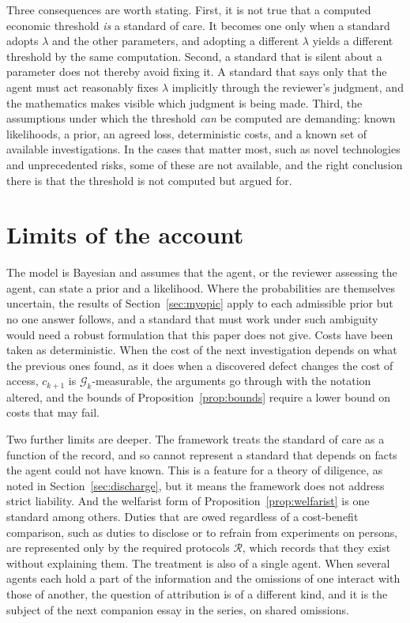 \documentclass[11pt]{article}
\newcommand{\G}{\mathcal G}
\theoremstyle{plain}
\theoremstyle{definition}
\begin{document}
Three consequences are worth stating. First, it is not true that a computed economic threshold \emph{is} a standard of care. It becomes one only when a standard adopts $\lambda$ and the other parameters, and adopting a different $\lambda$ yields a different threshold by the same computation. Second, a standard that is silent about a parameter does not thereby avoid fixing it. A standard that says only that the agent must act reasonably fixes $\lambda$ implicitly through the reviewer's judgment, and the mathematics makes visible which judgment is being made. Third, the assumptions under which the threshold \emph{can} be computed are demanding: known likelihoods, a prior, an agreed loss, deterministic costs, and a known set of available investigations. In the cases that matter most, such as novel technologies and unprecedented risks, some of these are not available, and the right conclusion there is that the threshold is not computed but argued for.

\section{Limits of the account}\label{sec:limits}

The model is Bayesian and assumes that the agent, or the reviewer assessing the agent, can state a prior and a likelihood. Where the probabilities are themselves uncertain, the results of Section~\ref{sec:myopic} apply to each admissible prior but no one answer follows, and a standard that must work under such ambiguity would need a robust formulation that this paper does not give. Costs have been taken as deterministic. When the cost of the next investigation depends on what the previous ones found, as it does when a discovered defect changes the cost of access, $c_{k+1}$ is $\G_k$-measurable, the arguments go through with the notation altered, and the bounds of Proposition~\ref{prop:bounds} require a lower bound on costs that may fail.

Two further limits are deeper. The framework treats the standard of care as a function of the record, and so cannot represent a standard that depends on facts the agent could not have known. This is a feature for a theory of diligence, as noted in Section~\ref{sec:discharge}, but it means the framework does not address strict liability. And the welfarist form of Proposition~\ref{prop:welfarist} is one standard among others. Duties that are owed regardless of a cost-benefit comparison, such as duties to disclose or to refrain from experiments on persons, are represented only by the required protocols $\mathcal R$, which records that they exist without explaining them. The treatment is also of a single agent. When several agents each hold a part of the information and the omissions of one interact with those of another, the question of attribution is of a different kind, and it is the subject of the next companion essay in the series, on shared omissions.
\end{document}
